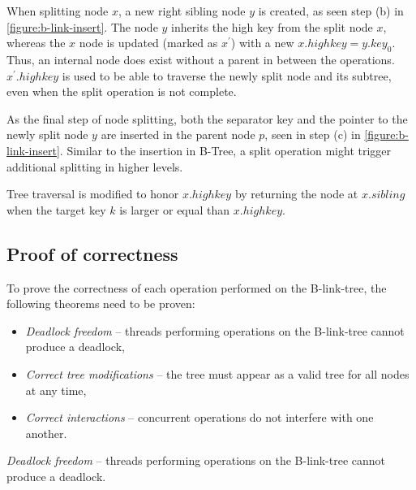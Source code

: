 When splitting node $x$, a new right sibling node $y$ is created, as seen step (b) in \cref{figure:b-link-insert}. The node $y$ inherits the high key from the split node $x$, whereas the $x$ node is updated (marked as $x^\prime$) with a new $x.highkey = y.key_0$. Thus, an internal node does exist without a parent in between the operations. $x^\prime.highkey$ is used to be able to traverse the newly split node and its subtree, even when the split operation is not complete.

As the final step of node splitting, both the separator key and the pointer to the newly split node $y$ are inserted in the parent node $p$, seen in step (c) in \cref{figure:b-link-insert}. Similar to the insertion in B-Tree, a split operation might trigger additional splitting in higher levels.

Tree traversal is modified to honor $x.highkey$ by returning the node at $x.sibling$ when the target key $k$ is larger or equal than $x.highkey$.

\subsection{Proof of correctness}

To prove the correctness of each operation performed on the B-link-tree, the following theorems need to be proven:

\begin{itemize}
  \item \textit{Deadlock freedom} -- threads performing operations on the B-link-tree cannot produce a deadlock,
  \item \textit{Correct tree modifications} -- the tree must appear as a valid tree for all nodes at any time,
  \item \textit{Correct interactions} -- concurrent operations do not interfere with one another.
\end{itemize}

\begin{theorem}
  \textit{Deadlock freedom} -- threads performing operations on the B-link-tree cannot produce a deadlock.
\end{theorem}

